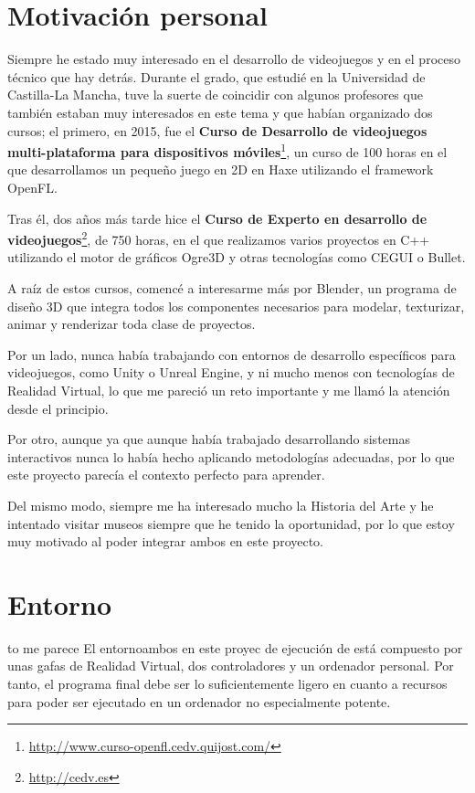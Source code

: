 \section{Motivación personal}

Siempre he estado muy interesado en el desarrollo de videojuegos y en el proceso técnico que hay detrás. Durante el grado, que estudié en la Universidad de Castilla-La Mancha, tuve la suerte de coincidir con algunos profesores que también estaban muy interesados en este tema y que habían organizado dos cursos; el primero, en 2015, fue el \textbf{Curso de Desarrollo de videojuegos multi-plataforma para dispositivos móviles}\footnote{\url{http://www.curso-openfl.cedv.quijost.com/}}, un curso de 100 horas en el que desarrollamos un pequeño juego en 2D en Haxe utilizando el framework OpenFL.

Tras él, dos años más tarde hice el \textbf{Curso de Experto en desarrollo de videojuegos}\footnote{\url{http://cedv.es}}, de 750 horas, en el que realizamos varios proyectos en C++ utilizando el motor de gráficos Ogre3D y otras tecnologías como CEGUI o Bullet.

A raíz de estos cursos, comencé a interesarme más por Blender, un programa de diseño 3D que integra todos los componentes necesarios para modelar, texturizar, animar y renderizar toda clase de proyectos.

Por un lado, nunca había trabajando con entornos de desarrollo específicos para videojuegos, como Unity o Unreal Engine, y ni mucho menos con tecnologías de Realidad Virtual, lo que me pareció un reto importante y me llamó la atención desde el principio. 

Por otro, aunque ya que aunque había trabajado desarrollando sistemas interactivos nunca lo había hecho aplicando metodologías adecuadas, por lo que este proyecto parecía el contexto perfecto para aprender.

Del mismo modo, siempre me ha interesado mucho la Historia del Arte y he intentado visitar museos siempre que he tenido la oportunidad, por lo que estoy muy motivado al poder integrar ambos en este proyecto.

\section{Entorno}
to me parece 
El entornoambos en este proyec de ejecución de \MineRVa está compuesto por unas gafas de Realidad Virtual, dos controladores y un ordenador personal. Por tanto, el programa final debe ser lo suficientemente ligero en cuanto a recursos para poder ser ejecutado en un ordenador no especialmente potente.

